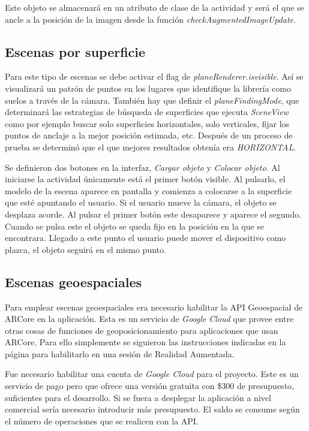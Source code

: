 Este objeto se almacenará en un atributo de clase de la actividad y será el que se ancle a la posición de la imagen desde la función \textit{checkAugmentedImageUpdate}.

\subsection{Escenas por superficie}

Para este tipo de escenas se debe activar el flag de \textit{planeRenderer.isvisible}. Así se visualizará un patrón de puntos en los lugares que identifique la librería como suelos a través de la cámara. También hay que definir el \textit{planeFindingMode}, que determinará las estrategias de búsqueda de superficies que ejecuta \textit{SceneView} como por ejemplo buscar solo superficies horizontales, solo verticales, fijar los puntos de anclaje a la mejor posición estimada, etc. Después de un proceso de prueba se determinó que el que mejores resultados obtenía era \textit{HORIZONTAL}.


Se definieron dos botones en la interfaz, \textit{Cargar objeto} y \textit{Colocar objeto}. Al iniciarse la actividad únicamente está el primer botón visible. Al pulsarlo, el modelo de la escena aparece en pantalla y comienza a colocarse a la superficie que esté apuntando el usuario. Si el usuario mueve la cámara, el objeto se desplaza acorde. Al pulsar el primer botón este desaparece y aparece el segundo. Cuando se pulsa este el objeto se queda fijo en la posición en la que se encontrara. Llegado a este punto el usuario puede mover el dispositivo como plazca, el objeto seguirá en el mismo punto.


\subsection{Escenas geoespaciales}

Para emplear escenas geoespaciales era necesario habilitar la API Geoespacial\cite{geospatialapi} de ARCore en la aplicación. Esta es un servicio de \textit{Google Cloud} que provee entre otras cosas de funciones de geoposicionamiento para aplicaciones que usan ARCore. Para ello simplemente se siguieron las instrucciones indicadas en la página para habilitarlo en una sesión de Realidad Aumentada.

Fue necesario habilitar una cuenta de \textit{Google Cloud} para el proyecto. Este es un servicio de pago pero que ofrece una versión gratuita con \$300 de presupuesto, suficientes para el desarrollo. Si se fuera a desplegar la aplicación a nivel comercial sería necesario introducir más presupuesto. El saldo se consume según el número de operaciones que se realicen con la API.

